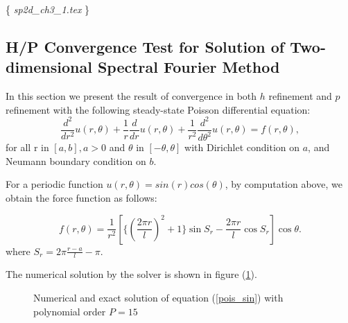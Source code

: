 \{ {\it  sp2d\_ch3\_1.tex} \}

\subsection {H/P Convergence Test for Solution of Two-dimensional Spectral Fourier Method}

In this section we present the result of convergence in both $h$ refinement and $p$ refinement with the following steady-state Poisson differential equation:
\begin{equation}
\label{pois_sin2}
\frac{d^2}{dr^2} u(r, \theta) + \frac{1}{r} \frac{d}{dr} u(r,\theta) + \frac{1}{r^2} \frac{d^2}{d\theta^2} u(r, \theta)= f(r, \theta),
\end{equation}
for all r in $[a, b], a > 0$ and $\theta$ in $[-\theta, \theta]$ with Dirichlet condition on $a$, and Neumann boundary condition on $b$.

For a periodic function $u(r, \theta) = sin(r)cos(\theta)$, by computation above, we obtain the force function as follows:

\begin{equation}
f(r, \theta) =  \frac{1}{r^2}\left[\{(\frac{2\pi r}{l})^2+1\}\sin S_r - \frac{2 \pi r}{l}\cos S_r \right]\cos\theta.
\end{equation}
where $S_r = 2 \pi \frac{r-a}{l} -\pi$.

The numerical solution by the solver is shown in figure (\ref{sinsol2}).

\begin{figure}[h]
    \begin{center}
    \caption{\label{sinsol2}
    Numerical and exact solution of equation (\ref{pois_sin}) with polynomial order $P=15$}
    \end{center}
\end{figure}


